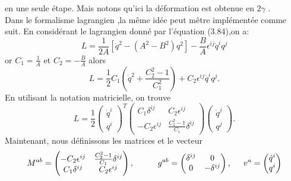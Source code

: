 \documentclass[12pt,a4paper, openany]{report}
\begin{document}
	en une seule étape. Mais notons qu'ici la déformation est obtenue en $
	2\gamma$ .\\ Dans le formalisme lagrangien ,la m\^{e}me  idée peut m\^{e}tre implémentée comme suit. En considérant le lagrangien donné par l'équation (3.84),on a:
	\begin{equation*}
		L=\frac{1}{2A}\left[\dot{q}^{2}-\left(A^{2}-B^{2}\right)q^{2}\right]-\frac{B}{A}\epsilon^{ij}\dot{q}^iq^j
	\end{equation*}
	or\hspace{0.3cm} $C_1=\frac{1}{A}$\hspace{0.2cm} et\hspace{0.2cm} $C_2=-\frac{B}{A}$\hspace{0.5cm} alors 
	\begin{equation}
		L=\frac{1}{2}C_1\left(\dot{q}^2+\frac{C^2_2-1}{C^2_1}\right)+C_2 \epsilon^{ij} \dot{q}^iq^j .
	\end{equation} En utilisant la notation matricielle, on trouve 
	\begin{equation}
		L=\frac{1}{2}
		\begin{pmatrix}
			\dot{q}^i \\
			q^i 
		\end{pmatrix}
		^{T}
		\begin{pmatrix}
			C_1\delta^{ij} & C_2\epsilon^{ij} \\
			-C_2\epsilon^{ij} & \frac{C^2_2-1}{C_1}\delta^{ij}
		\end{pmatrix}
		\begin{pmatrix}
			\dot{q}^j \\
			q^j	
		\end{pmatrix} .
	\end{equation}
	Maintenant, nous définissons les matrices et le vecteur
	\begin{equation}
		M^{ab}= 
		\begin{pmatrix}
			-C_2\epsilon^{ij} & \frac{C^2_2-1}{C_1}\delta^{ij}	\\
			C_1\delta^{ij} & C_2\epsilon^{ij} 
		\end{pmatrix} , \hspace{1cm}g^{ab}=
		\begin{pmatrix}
			\delta^{ij} & 0 \\
			0 & -\delta^{ij}
		\end{pmatrix} , \hspace{0.5cm} v^a=
		\begin{pmatrix}
			\dot{q}^i \\
			q^i
		\end{pmatrix}
	\end{equation}
\end{document}
